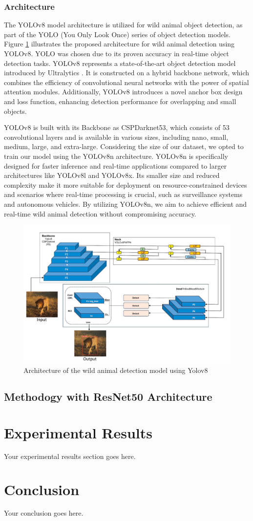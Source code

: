 \documentclass[conference]{IEEEtran}
\begin{document}
\subsubsection{Architecture}
The YOLOv8 model architecture is utilized for wild animal object detection, as part of the YOLO (You Only Look Once) series of object detection models. Figure \ref{fig:Architecture of the wild animal detection model using Yolov8} illustrates the proposed architecture for wild animal detection using YOLOv8. YOLO was chosen due to its proven accuracy in real-time object detection tasks. YOLOv8 represents a state-of-the-art object detection model introduced by Ultralytics \cite{dave2023wild}. It is constructed on a hybrid backbone network, which combines the efficiency of convolutional neural networks with the power of spatial attention modules. Additionally, YOLOv8 introduces a novel anchor box design and loss function, enhancing detection performance for overlapping and small objects.

YOLOv8 is built with its Backbone as CSPDarknet53, which consists of 53 convolutional layers and is available in various sizes, including nano, small, medium, large, and extra-large. Considering the size of our dataset, we opted to train our model using the YOLOv8n architecture. YOLOv8n is specifically designed for faster inference and real-time applications compared to larger architectures like YOLOv8l and YOLOv8x. Its smaller size and reduced complexity make it more suitable for deployment on resource-constrained devices and scenarios where real-time processing is crucial, such as surveillance systems and autonomous vehicles. By utilizing YOLOv8n, we aim to achieve efficient and real-time wild animal detection without compromising accuracy.

\begin{figure}[htbp]
    \centering
    \includegraphics[width=3 in]{fig4.png}
    \caption{Architecture of the wild animal detection model using Yolov8}
    \label{fig:Architecture of the wild animal detection model using Yolov8}
\end{figure}

\subsection{Methodogy with ResNet50 Architecture}

\section{Experimental Results}
Your experimental results section goes here.

\section{Conclusion}
Your conclusion goes here.



\end{document}
